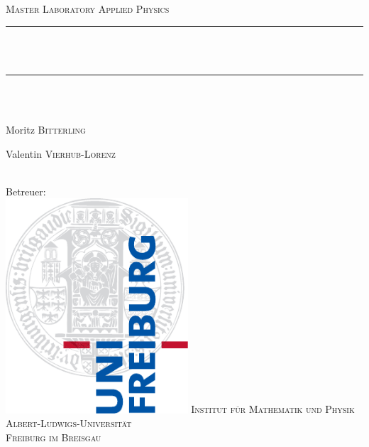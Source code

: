 \newcommand{\HRule}{\rule{\linewidth}{0.5mm}}
\begin{titlepage}
\begin{center}
  \textsc{\Large Master Laboratory Applied Physics}\\[0.5cm]
  \HRule \\[0.5cm]
  { \huge \bfseries \exptitle}\\
  \HRule \\[0.5cm]
  \large \expdate\\[1cm]  
  \begin{minipage}{0.4\textwidth}
    \begin{flushleft} 
    \large
      Moritz \textsc{Bitterling}
    \end{flushleft}
  \end{minipage}
  \hfill
  \begin{minipage}{0.4\textwidth}
    \begin{flushright}
    \large
      Valentin \textsc{Vierhub-Lorenz}
    \end{flushright}
  \end{minipage}
  \\[1.5cm]
  \large 
  Betreuer: \exptutor \\[2cm]
  \includegraphics[height=8cm]{img/logo_uni.pdf}
  \vfill
  \normalsize
  \textsc{Institut für Mathematik und Physik} \\
  \textsc{Albert-Ludwigs-Universität} \\
  \textsc{Freiburg im Breisgau}
\end{center}
\end{titlepage}